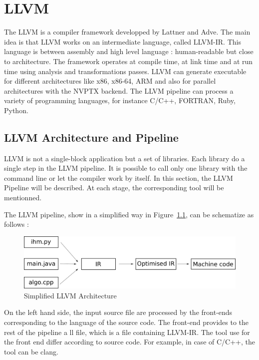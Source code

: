 \chapter{LLVM}\label{ch:LLVM}

The \ac{LLVM} is a compiler framework developped by Lattner and Adve\cite{LLVM}. The main idea is that LLVM works on an intermediate language, called LLVM-IR. This language is between assembly and high level language : human-readable but close to architecture. The framework operates at compile time, at link time and at run time using analysis and transformations passes. LLVM can generate executable for different architectures like x86, x86-64, ARM and also for parallel architectures with the NVPTX backend. The LLVM pipeline can process a variety of programming languages, for instance C/C++, FORTRAN, Ruby, Python. 

\section{LLVM Architecture and Pipeline}
LLVM is not a single-block application but a set of libraries. Each library do a single step in the LLVM pipeline. It is possible to call only one library with the command line or let the compiler work by itself. In this section, the LLVM Pipeline will be described. At each stage, the corresponding tool will be mentionned.

The LLVM pipeline, show in a simplified way in Figure~\ref{fig:Architecture}, can be schematize as follows :

\begin{figure}
\centering
\includegraphics[scale=0.25]{gfx/LLVM/Architecture.png}
\caption{Simplified LLVM Architecture}
\label{fig:Architecture}
\end{figure}

On the left hand side, the input source file are processed by the front-ends corresponding to the language of the source code. The front-end provides to the rest of the pipeline a ll file, which is a file containing LLVM-IR. The tool use for the front end differ according to source code. For example, in case of C/C++, the tool can be clang.


